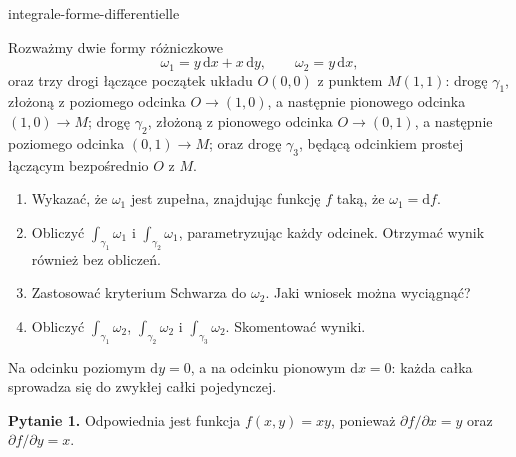 
\begin{exo}{integrale-forme-differentielle}

Rozważmy dwie formy różniczkowe
\[\omega_1=y\,\mathrm{d}x+x\,\mathrm{d}y,\qquad\omega_2=y\,\mathrm{d}x,\]
oraz trzy drogi łączące początek układu $O(0,0)$ z punktem $M(1,1)$: drogę
$\gamma_1$, złożoną z poziomego odcinka $O\to(1,0)$, a następnie pionowego
odcinka $(1,0)\to M$; drogę $\gamma_2$, złożoną z pionowego odcinka
$O\to(0,1)$, a następnie poziomego odcinka $(0,1)\to M$; oraz drogę
$\gamma_3$, będącą odcinkiem prostej łączącym bezpośrednio $O$ z $M$.

\begin{enumerate}
\item Wykazać, że $\omega_1$ jest zupełna, znajdując funkcję $f$ taką, że $\omega_1=\mathrm{d}f$.
\item Obliczyć $\int_{\gamma_1}\omega_1$ i $\int_{\gamma_2}\omega_1$, parametryzując każdy odcinek. Otrzymać wynik również bez obliczeń.
\item Zastosować kryterium Schwarza do $\omega_2$. Jaki wniosek można wyciągnąć?
\item Obliczyć $\int_{\gamma_1}\omega_2$, $\int_{\gamma_2}\omega_2$ i $\int_{\gamma_3}\omega_2$. Skomentować wyniki.
\end{enumerate}

\begin{indication}
Na odcinku poziomym $\mathrm{d}y=0$, a na odcinku pionowym $\mathrm{d}x=0$:
każda całka sprowadza się do zwykłej całki pojedynczej.
\end{indication}

\begin{solution}
\textbf{Pytanie 1.} Odpowiednia jest funkcja $f(x,y)=xy$, ponieważ $\partial f/\partial x=y$ oraz $\partial f/\partial y=x$.


\end{solution}
\end{exo}
